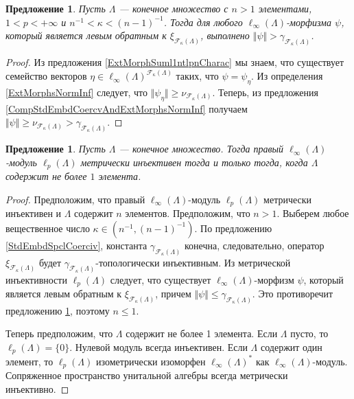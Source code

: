 \documentclass[12pt]{article}
\newtheorem{proposition}[theorem]{Предложение}
\begin{document}
\begin{proposition}\label{RetrPrblmNoSln}
    Пусть $\Lambda$ --- конечное множество с $n>1$ элементами, $1<p<+\infty$ 
    и $n^{-1}<\kappa<(n-1)^{-1}$. Тогда для 
    любого $\ell_\infty(\Lambda)$-морфизма $\psi$, который является левым 
    обратным к $\xi_{\mathcal{F}_{\kappa}(\Lambda)}$, 
    выполнено $\Vert \psi\Vert>\gamma_{\mathcal{F}_{\kappa}(\Lambda)}$.  
\end{proposition}
\begin{proof}
    Из предложения \ref{ExtMorphSuml1ntlpnCharac} мы знаем, что существует 
    семейство 
    векторов $\eta\in\ell_\infty(\Lambda)^{\mathcal{F}_{\kappa}(\Lambda)}$ 
    таких, что  $\psi=\psi_{\eta}$. Из определения \ref{ExtMorphsNormInf} 
    следует, 
    что $\Vert \psi_{\eta}\Vert\geq \nu_{\mathcal{F}_{\kappa}(\Lambda)}$. 
    Теперь, из предложения \ref{CompStdEmbdCoercvAndExtMorphsNormInf} получаем 
    $\Vert\psi\Vert\geq\nu_{\mathcal{F}_{\kappa}(\Lambda)} > 
    \gamma_{\mathcal{F}_{\kappa}(\Lambda)}$.
\end{proof}

\begin{proposition}\label{linftnModlpnIsntMetInjCharac}
    Пусть $\Lambda$ --- конечное множество. Тогда 
    правый $\ell_\infty(\Lambda)$-модуль $\ell_p(\Lambda)$ метрически 
    инъективен тогда и только тогда, когда $\Lambda$ содержит не 
    более $1$ элемента.
\end{proposition}
\begin{proof}
    Предположим, что правый $\ell_\infty(\Lambda)$-модуль $\ell_p(\Lambda)$ 
    метрически инъективен и $\Lambda$ содержит $n$ элементов. Предположим, 
    что $n>1$. Выберем любое вещественное число $\kappa\in(n^{-1},(n-1)^{-1})$. 
    По предложению \ref{StdEmbdSpclCoerciv}, 
    константа $\gamma_{\mathcal{F}_{\kappa}(\Lambda)}$ конечна, 
    следовательно, оператор $\xi_{\mathcal{F}_{\kappa}(\Lambda)}$
    будет $\gamma_{\mathcal{F}_{\kappa}(\Lambda)}$-топологически инъективным. 
    Из метрической инъективности $\ell_p(\Lambda)$ следует, что существует 
    $\ell_\infty(\Lambda)$-морфизм $\psi$, который является левым обратным к 
    $\xi_{\mathcal{F}_{\kappa}(\Lambda)}$, 
    причем $\Vert\psi\Vert\leq\gamma_{\mathcal{F}_{\kappa}(\Lambda)}$. Это 
    противоречит предложению \ref{RetrPrblmNoSln}, 
    поэтому $n\leq 1$.

    Теперь предположим, что $\Lambda$ содержит не более 1 элемента. 
    Если $\Lambda$ пусто, то $\ell_p(\Lambda)=\{0\}$. Нулевой модуль всегда 
    инъективен. Если $\Lambda$ содержит один элемент, то $\ell_p(\Lambda)$ 
    изометрически изоморфен $\ell_\infty(\Lambda)^*$ 
    как $\ell_\infty(\Lambda)$-модуль. Сопряженное пространство унитальной 
    алгебры всегда метрически инъективно.
\end{proof}
\end{document}
